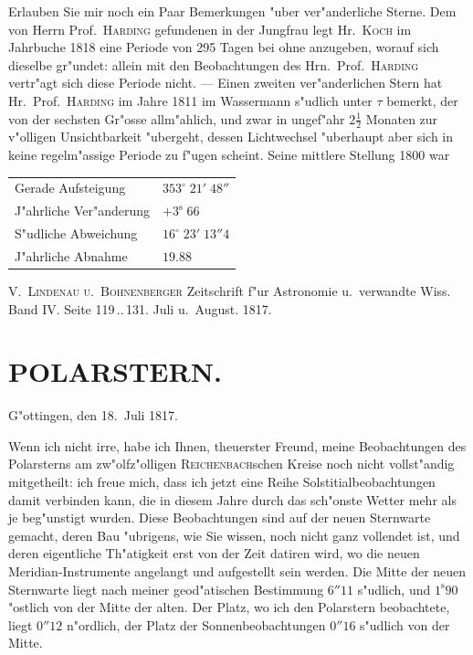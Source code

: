 \documentclass[12pt,a4paper]{article}
\begin{document}
Erlauben Sie mir noch ein Paar Bemerkungen "uber ver"anderliche Sterne. Dem von Herrn Prof.~\textsc{Harding}
gefundenen in der Jungfrau legt Hr.~\textsc{Koch} im Jahrbuche 1818 eine Periode von 295 Tagen bei
ohne anzugeben, worauf sich dieselbe gr"undet: allein mit den Beobachtungen des Hrn.~Prof.~\textsc{Harding}
vertr"agt sich diese Periode nicht. --- Einen zweiten ver"anderlichen Stern hat Hr.~Prof.~\textsc{Harding} im
Jahre 1811 im Wassermann s"udlich unter $\tau$ bemerkt, der von der sechsten Gr"osse allm"ahlich, und zwar
in ungef"ahr $2\frac{1}{2}$ Monaten zur v"olligen Unsichtbarkeit "ubergeht, dessen Lichtwechsel "uberhaupt aber sich
in keine regelm"assige Periode zu f"ugen scheint. Seine mittlere Stellung 1800 war

\begin{center}
\begin{tabular}{l@{\dotfill}l}
Gerade Aufsteigung & $353^{\circ}\;21'\;48''$ \\
J"ahrliche Ver"anderung & $+3^{\mathrm{s}}\;66$ \\
S"udliche Abweichung & $16^{\circ}\;23'\;13''4$ \\
J"ahrliche Abnahme & $19.88$
\end{tabular}
\end{center}

\begin{flushright}
\textsc{V.~Lindenau u.~Bohnenberger} Zeitschrift f"ur Astronomie u.~verwandte Wiss.\\
Band IV. Seite 119\,..\,131. Juli u.~August. 1817.
\end{flushright}

\newpage

\section*{POLARSTERN.}

\begin{flushright}
G"ottingen, den 18.~Juli 1817.
\end{flushright}

Wenn ich nicht irre, habe ich Ihnen, theuerster Freund, meine Beobachtungen des Polarsterns
am zw"olfz"olligen \textsc{Reichenbach}schen Kreise noch nicht vollst"andig mitgetheilt: ich freue mich, dass ich
jetzt eine Reihe Solstitialbeobachtungen damit verbinden kann, die in diesem Jahre durch das sch"onste
Wetter mehr als je beg"unstigt wurden. Diese Beobachtungen sind auf der neuen Sternwarte gemacht,
deren Bau "ubrigens, wie Sie wissen, noch nicht ganz vollendet ist, und deren eigentliche Th"atigkeit erst
von der Zeit datiren wird, wo die neuen Meridian-Instrumente angelangt und aufgestellt sein werden.
Die Mitte der neuen Sternwarte liegt nach meiner geod"atischen Bestimmung $6''11$ s"udlich, und $1^{\mathrm{s}}90$
"ostlich von der Mitte der alten. Der Platz, wo ich den Polarstern beobachtete, liegt $0''12$ n"ordlich, der
Platz der Sonnenbeobachtungen $0''16$ s"udlich von der Mitte.
\end{document}
